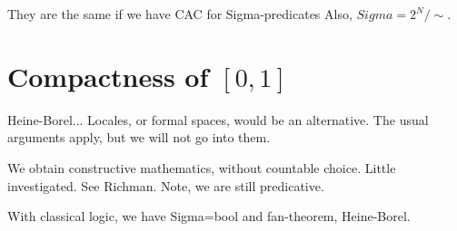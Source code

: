 They are the same if we have CAC for Sigma-predicates
Also, $Sigma = 2^N/\sim$.

\section{Compactness of $[0,1]$}
\label{sec:compactness-0-1}

Heine-Borel... Locales, or formal spaces, would be an alternative. The usual arguments
apply, but we will not go into them.

We obtain constructive mathematics, without countable choice. Little investigated.
See Richman. Note, we are still predicative.

With classical logic, we have Sigma=bool and fan-theorem, Heine-Borel.


